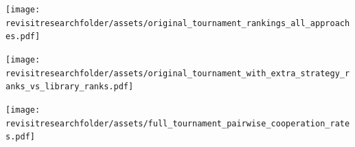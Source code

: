 \documentclass{beamer}
\newcommand{\revisitresearchfolder}{$HOME/rsc/revisiting-axelrod-second}
\newcommand{\mlresearchfolder}{$HOME/rsc/ml-paper}
\begin{document}
    \begin{frame}
        \begin{center}
            \texttt{[image: \\revisitresearchfolder/assets/original\_tournament\_rankings\_all\_approaches.pdf]}
        \end{center}

    \end{frame}

    \begin{frame}
        \begin{center}
            \texttt{[image: \\revisitresearchfolder/assets/original\_tournament\_with\_extra\_strategy\_ranks\_vs\_library\_ranks.pdf]}
        \end{center}

    \end{frame}

    \begin{frame}
        \begin{center}
            \texttt{[image: \\revisitresearchfolder/assets/full\_tournament\_pairwise\_cooperation\_rates.pdf]}
        \end{center}

    \end{frame}


    \begin{frame}
        \scalebox{.7}{
            
        }

    \end{frame}
\end{document}
